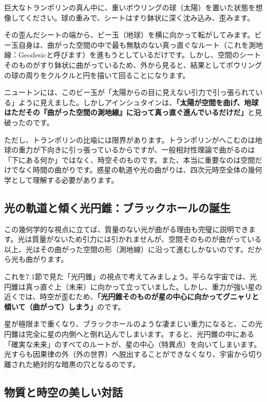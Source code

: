巨大なトランポリンの真ん中に、重いボウリングの球（太陽）を置いた状態を想像してください。球の重みで、シートはすり鉢状に深く沈み込み、歪みます。

その歪んだシートの端から、ビー玉（地球）を横に向かって転がしてみます。ビー玉自身は、曲がった空間の中で最も無駄のない真っ直ぐなルート（これを測地線：Geodesicと呼びます）を進もうとしているだけです。しかし、空間のシートそのものがすり鉢状に曲がっているため、外から見ると、結果としてボウリングの球の周りをクルクルと円を描いて回ることになります。

ニュートンには、このビー玉が「太陽からの目に見えない引力で引っ張られている」ように見えました。しかしアインシュタインは、\textbf{「太陽が空間を曲げ、地球はただその『曲がった空間の測地線』に沿って真っ直ぐ進んでいるだけだ」}と見破ったのです。

ただし、トランポリンの比喩には限界があります。トランポリンがへこむのは地球の重力が下向きに引っ張っているからですが、一般相対性理論で曲がるのは「下にある何か」ではなく、時空そのものです。また、本当に重要なのは空間だけでなく時間の曲がりです。惑星の軌道や光の曲がりは、四次元時空全体の幾何学として理解する必要があります。

\subsection{光の軌道と傾く光円錐：ブラックホールの誕生}

この幾何学的な視点に立てば、質量のない光が曲がる理由も完璧に説明できます。光は質量がないため引力には引かれませんが、空間そのものが曲がっている以上、光はその曲がった空間の形（測地線）に沿って進むしかないのです。だから光も曲がります。

これを7.1節で見た「光円錐」の視点で考えてみましょう。平らな宇宙では、光円錐は真っ直ぐ上（未来）に向かって立っていました。しかし、重力が強い星の近くでは、時空が歪むため、\textbf{「光円錐そのものが星の中心に向かってグニャリと傾いて（曲がって）しまう」}のです。

星が極限まで重くなり、ブラックホールのような凄まじい重力になると、この光円錐は完全に星の内側へと倒れ込んでしまいます。すると、光円錐の中にある「確実な未来」のすべてのルートが、星の中心（特異点）を向いてしまいます。光すらも因果律の外（外の世界）へ脱出することができなくなり、宇宙から切り離された絶対的な暗黒の穴となるのです。

\subsection{物質と時空の美しい対話}

